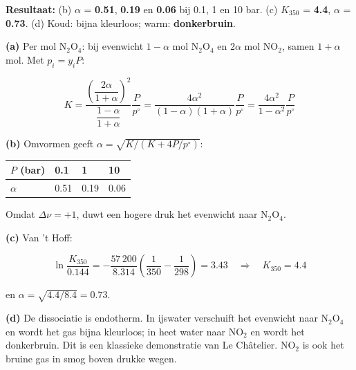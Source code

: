 \begin{oplossing}
\textbf{Resultaat:} (b) \(\alpha\) = \textbf{0.51}, \textbf{0.19} en \textbf{0.06} bij 0.1, 1 en 10 bar. (c) \(K_{350}\) = \textbf{4.4}, \(\alpha\) = \textbf{0.73}. (d) Koud: bijna kleurloos; warm: \textbf{donkerbruin}.

\textbf{(a)} Per mol \(\mathrm{N_2O_4}\): bij evenwicht \(1-\alpha\) mol \(\mathrm{N_2O_4}\) en \(2\alpha\) mol \(\mathrm{NO_2}\), samen \(1+\alpha\) mol. Met \(p_i = y_iP\):

\[
K = \frac{\left(\dfrac{2\alpha}{1+\alpha}\right)^2}{\dfrac{1-\alpha}{1+\alpha}}\frac{P}{p^\circ} = \frac{4\alpha^2}{(1-\alpha)(1+\alpha)}\frac{P}{p^\circ} = \frac{4\alpha^2}{1-\alpha^2}\frac{P}{p^\circ}
\]

\textbf{(b)} Omvormen geeft \(\alpha = \sqrt{K/(K + 4P/p^\circ)}\):

\begin{center}
\begin{tabular}{llll}
\toprule
\(P\) (bar) & 0.1 & 1 & 10 \\
\midrule
\(\alpha\) & 0.51 & 0.19 & 0.06 \\
\bottomrule
\end{tabular}
\end{center}

Omdat \(\Delta\nu = +1\), duwt een hogere druk het evenwicht naar \(\mathrm{N_2O_4}\).

\textbf{(c)} Van 't Hoff:

\[
\ln\frac{K_{350}}{0.144} = -\frac{57\,200}{8.314}\left(\frac{1}{350} - \frac{1}{298}\right) = 3.43 \quad\Rightarrow\quad K_{350} = 4.4
\]

en \(\alpha = \sqrt{4.4/8.4} = 0.73\).

\textbf{(d)} De dissociatie is endotherm. In ijswater verschuift het evenwicht naar \(\mathrm{N_2O_4}\) en wordt het gas bijna kleurloos; in heet water naar \(\mathrm{NO_2}\) en wordt het donkerbruin. Dit is een klassieke demonstratie van Le Châtelier. \(\mathrm{NO_2}\) is ook het bruine gas in smog boven drukke wegen.
\end{oplossing}

